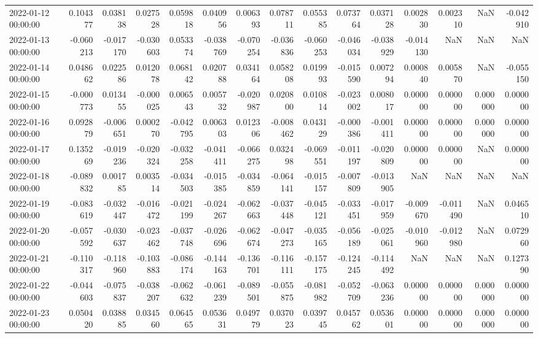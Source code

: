 \begin{tabular}{lrrrrrrrrrrrrrr}
2022-01-12 00:00:00 & 0.104377 & 0.038138 & 0.027528 & 0.059818 & 0.040956 & 0.006393 & 0.078711 & 0.055385 & 0.073764 & 0.037128 & 0.002830 & 0.002310 & NaN & -0.042910 \\
2022-01-13 00:00:00 & -0.060213 & -0.017170 & -0.030603 & 0.053374 & -0.038769 & -0.070254 & -0.036836 & -0.060253 & -0.046034 & -0.038929 & -0.014130 & NaN & NaN & NaN \\
2022-01-14 00:00:00 & 0.048662 & 0.022586 & 0.012078 & 0.068142 & 0.020788 & 0.034164 & 0.058208 & 0.019993 & -0.015590 & 0.007294 & 0.000840 & 0.005870 & NaN & -0.055150 \\
2022-01-15 00:00:00 & -0.000773 & 0.013455 & -0.000025 & 0.006543 & 0.005732 & -0.020987 & 0.020800 & 0.010814 & -0.023002 & 0.008017 & 0.000000 & 0.000000 & 0.000000 & 0.000000 \\
2022-01-16 00:00:00 & 0.092879 & -0.006651 & 0.000270 & -0.042795 & 0.006303 & 0.012306 & -0.008462 & 0.043129 & -0.000386 & -0.001411 & 0.000000 & 0.000000 & 0.000000 & 0.000000 \\
2022-01-17 00:00:00 & 0.135269 & -0.019236 & -0.020324 & -0.032258 & -0.041411 & -0.066275 & 0.032498 & -0.069551 & -0.011197 & -0.020809 & 0.000000 & 0.000000 & NaN & 0.000000 \\
2022-01-18 00:00:00 & -0.089832 & 0.001785 & 0.003514 & -0.034503 & -0.015385 & -0.034859 & -0.064141 & -0.015157 & -0.007809 & -0.013905 & NaN & NaN & NaN & NaN \\
2022-01-19 00:00:00 & -0.083619 & -0.032447 & -0.016472 & -0.021199 & -0.024267 & -0.062663 & -0.037448 & -0.045121 & -0.033451 & -0.017959 & -0.009670 & -0.011490 & NaN & 0.046510 \\
2022-01-20 00:00:00 & -0.057592 & -0.030637 & -0.023462 & -0.037748 & -0.026696 & -0.062674 & -0.047273 & -0.035165 & -0.056189 & -0.025061 & -0.010960 & -0.012980 & NaN & 0.072960 \\
2022-01-21 00:00:00 & -0.110317 & -0.118960 & -0.103883 & -0.086174 & -0.144163 & -0.136701 & -0.116111 & -0.157175 & -0.124245 & -0.114492 & NaN & NaN & NaN & 0.127390 \\
2022-01-22 00:00:00 & -0.044603 & -0.075837 & -0.038207 & -0.062632 & -0.061239 & -0.089501 & -0.055875 & -0.081982 & -0.052709 & -0.063236 & 0.000000 & 0.000000 & 0.000000 & 0.000000 \\
2022-01-23 00:00:00 & 0.050420 & 0.038885 & 0.034560 & 0.064565 & 0.053631 & 0.049779 & 0.037023 & 0.039745 & 0.045762 & 0.053601 & 0.000000 & 0.000000 & 0.000000 & 0.000000 \\

\end{tabular}
